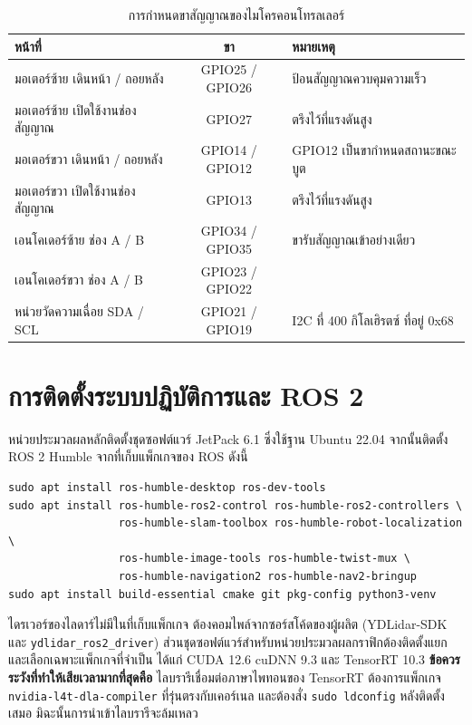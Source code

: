 \documentclass[a4paper,12pt]{report}
\begin{document}
\begin{table}[htbp]
\centering
\caption[การกำหนดขาสัญญาณของไมโครคอนโทรลเลอร์ (ภาคผนวก ก)]{การกำหนดขาสัญญาณของไมโครคอนโทรลเลอร์}
\label{tab:pinout}
\small
\begin{tabularx}{\textwidth}{|X|c|X|}
\hline
\textbf{หน้าที่} & \textbf{ขา} & \textbf{หมายเหตุ} \\
\hline
มอเตอร์ซ้าย เดินหน้า / ถอยหลัง & GPIO25 / GPIO26 & ป้อนสัญญาณควบคุมความเร็ว \\
\hline
มอเตอร์ซ้าย เปิดใช้งานช่องสัญญาณ & GPIO27 & ตรึงไว้ที่แรงดันสูง \\
\hline
มอเตอร์ขวา เดินหน้า / ถอยหลัง & GPIO14 / GPIO12 & GPIO12 เป็นขากำหนดสถานะขณะบูต \\
\hline
มอเตอร์ขวา เปิดใช้งานช่องสัญญาณ & GPIO13 & ตรึงไว้ที่แรงดันสูง \\
\hline
เอนโคเดอร์ซ้าย ช่อง A / B & GPIO34 / GPIO35 & ขารับสัญญาณเข้าอย่างเดียว \\
\hline
เอนโคเดอร์ขวา ช่อง A / B & GPIO23 / GPIO22 & \\
\hline
หน่วยวัดความเฉื่อย SDA / SCL & GPIO21 / GPIO19 & I2C ที่ 400 กิโลเฮิรตซ์ ที่อยู่ 0x68 \\
\hline
\end{tabularx}
\end{table}

\section{การติดตั้งระบบปฏิบัติการและ ROS 2}

หน่วยประมวลผลหลักติดตั้งชุดซอฟต์แวร์ JetPack 6.1 ซึ่งใช้ฐาน Ubuntu 22.04
จากนั้นติดตั้ง ROS 2 Humble จากที่เก็บแพ็กเกจของ ROS ดังนี้

{\small
\begin{verbatim}
sudo apt install ros-humble-desktop ros-dev-tools
sudo apt install ros-humble-ros2-control ros-humble-ros2-controllers \
                 ros-humble-slam-toolbox ros-humble-robot-localization \
                 ros-humble-image-tools ros-humble-twist-mux \
                 ros-humble-navigation2 ros-humble-nav2-bringup
sudo apt install build-essential cmake git pkg-config python3-venv
\end{verbatim}
}

ไดรเวอร์ของไลดาร์ไม่มีในที่เก็บแพ็กเกจ ต้องคอมไพล์จากซอร์สโค้ดของผู้ผลิต
(YDLidar-SDK และ \texttt{ydlidar\_ros2\_driver})
ส่วนชุดซอฟต์แวร์สำหรับหน่วยประมวลผลกราฟิกต้องติดตั้งแยกและเลือกเฉพาะแพ็กเกจที่จำเป็น
ได้แก่ CUDA 12.6 cuDNN 9.3 และ TensorRT 10.3
\textbf{ข้อควรระวังที่ทำให้เสียเวลามากที่สุดคือ} ไลบรารีเชื่อมต่อภาษาไพทอนของ TensorRT
ต้องการแพ็กเกจ \texttt{nvidia-l4t-dla-compiler} ที่รุ่นตรงกับเคอร์เนล
และต้องสั่ง \texttt{sudo ldconfig} หลังติดตั้งเสมอ มิฉะนั้นการนำเข้าไลบรารีจะล้มเหลว
\end{document}

